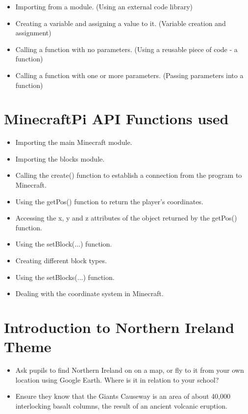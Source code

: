 \documentclass{geocraft-lesson-plan}
\begin{document}
\begin{itemize}
\item Importing from a module. (Using an external code library)
\item Creating a variable and assigning a value to it. (Variable creation and assignment) 
\item Calling a function with no parameters. (Using a reusable piece of code - a function)
\item Calling a function with one or more parameters. (Passing parameters into a function)
\end{itemize}

\section*{MinecraftPi API Functions used}

\begin{itemize}
\item Importing the main Minecraft module.
\item Importing the blocks module.
\item Calling the create() function to establish a connection from the program to Minecraft.
\item Using the getPos() function to return the player's coordinates.
\item Accessing the x, y and z attributes of the object returned by the getPos() function.
\item Using the setBlock(...) function.
\item Creating different block types.
\item Using the setBlocks(...) function.
\item Dealing with the coordinate system in Minecraft.
\end{itemize}

\section*{Introduction to Northern Ireland Theme}
\begin{itemize}
\item Ask pupils to find Northern Ireland on on a map, or fly to it from your own location using Google Earth. Where is
it in relation to your school?  
\item Ensure they know that the Giants Causeway is an area of about 40,000 interlocking basalt columns, the result of an
ancient volcanic eruption. 
\end{itemize}
\end{document}
